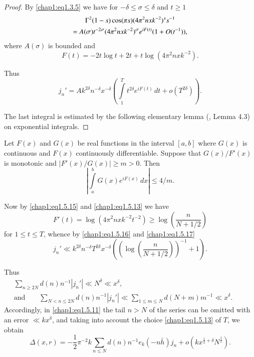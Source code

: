 \begin{proof}
By \eqref{chap1:eq1.3.5} we have for $-\delta\leq\sigma\leq\delta$ and
$t\geq 1$
\begin{gather}
\Gamma^2(1-s)\cos(\pi s)(4\pi^2nxk^{-2})^s s^{-1}\label{chap1:eq1.5.14}\\ 
=A(\sigma)t^{-2\sigma}(4\pi^2nxk^{-2})^\sigma e^{iF(t)}(1+O(t^{-1})),\notag 
\end{gather}
where $A(\sigma)$ is bounded and 
\begin{equation}\label{chap1:eq1.5.15}
F(t)= -2t\log t+2t+t\log(4\pi^2nxk^{-2}).
\end{equation}

Thus
\begin{equation}\label{chap1:eq1.5.16}
j_n'=Ak^{2\delta}n^{-\delta}x^{-\delta}\left(\int\limits_1^T
t^{2\delta}e^{iF(t)}\,dt+o(T^{2\delta})\right).
\end{equation}

The last integral is estimated by the following elementary lemma
(\cite{key27}, Lemma 4.3) on exponential integrals.
\end{proof}

\begin{lem}\label{chap1:lem1.6}
Let $F(x)$ and $G(x)$ be real functions in the interval $[a,b]$ where
$G(x)$ is continuous and $F(x)$ continuously differentiable. Suppose
that $G(x)/F'(x)$  is monotonic and $|F'(x)/G(x)|\geq m>0$. Then 
\begin{equation}\label{chap1:eq1.5.17}
|\int\limits_a^bG(x)e^{iF(x)}\,dx|\leq 4/m.
\end{equation}
\end{lem}

Now by \eqref{chap1:eq1.5.15} and \eqref{chap1:eq1.5.13} we have 
\begin{equation}\label{chap1:eq1.5.18}
F'(t)=\log(4\pi^2nxk^{-2}t^{-2})\geq\log \left(\frac{n}{N+1/2}\right) 
\end{equation}
for $1\leq t\leq T$, whence by \eqref{chap1:eq1.5.16} and
\eqref{chap1:eq1.5.17} 
$$
j_n'\ll k^{2\delta}n^{-\delta}T^{2\delta}x^{-\delta}\left(\left(\log\left(
\frac{n}{N+1/2}\right)\right)^{-1}+1\right).
$$

Thus 
\begin{gather*}
\sum\limits_{n\geq 2N}d(n)n^{-1}|j_n'|\ll N^\delta \ll x^\delta,\\
\text{and}\qquad \sum\limits_{N<n\leq 2N}d(n)n^{-1}|j_n'|\ll
\sum\limits_{1\leq m\leq N}d(N+m)m^{-1}\ll x^\delta.\qquad 
\end{gather*}\pageoriginale
Accordingly, in \eqref{chap1:eq1.5.11} the tail $n>N$ of the series
can be omitted with an error $\ll kx^\delta$, and taking into account
the choice \eqref{chap1:eq1.5.13} of $T$, we obtain 
\begin{equation}\label{chap1:eq1.5.19}
\Delta(x,r)=-\frac{1}{2}\pi^{-2}k\sum\limits_{n\leq N}d(n)n^{-1} e_k
(-n\bar{h})j_n+o(kx^{\frac{1}{2}+\delta} N^{\frac{1}{2}}).
\end{equation}

